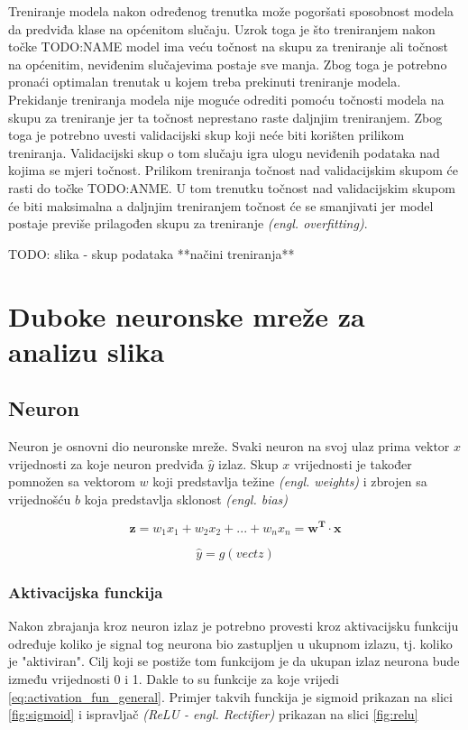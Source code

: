 \documentclass[times, utf8, zavrsni,numeric,pstricks]{fer}
\newcommand{\vect}[1]{\boldsymbol{#1}}
\begin{document}
Treniranje modela nakon određenog trenutka može pogoršati sposobnost modela da predviđa klase na općenitom slučaju. Uzrok toga je što treniranjem nakon točke TODO:NAME model ima veću točnost na skupu za treniranje ali točnost na općenitim, neviđenim slučajevima postaje sve manja. Zbog toga je potrebno pronaći optimalan trenutak u kojem treba prekinuti treniranje modela. Prekidanje treniranja modela nije moguće odrediti pomoću točnosti modela na skupu za treniranje jer ta točnost neprestano raste daljnjim treniranjem. Zbog toga je potrebno uvesti validacijski skup koji neće biti korišten prilikom treniranja. Validacijski skup o tom slučaju igra ulogu neviđenih podataka nad kojima se mjeri točnost. Prilikom treniranja točnost nad validacijskim skupom će rasti do točke TODO:ANME. U tom trenutku točnost nad validacijskim skupom će biti maksimalna a daljnjim treniranjem točnost će se smanjivati jer model postaje previše prilagođen skupu za treniranje \textit{(engl. overfitting)}. 

TODO: slika - skup podataka  
**načini treniranja**

\section{Duboke neuronske mreže za analizu slika}
\subsection{Neuron}
Neuron je osnovni dio neuronske mreže. Svaki neuron na svoj ulaz prima vektor $x$ vrijednosti za koje neuron predviđa $\hat{y}$ izlaz. Skup $x$ vrijednosti je također pomnožen sa vektorom $w$ koji predstavlja težine \textit{(engl. weights)} i zbrojen sa vrijednošću $b$ koja predstavlja sklonost \textit{(engl. bias)}


\begin{equation}\label{eq:neuron}
	\vect{z}=w_1x_1+w_2x_2+...+w_nx_n=\vect{w^{T}} \cdot \vect{x}
\end{equation}

\begin{equation}\label{eq:neuron}
	\hat{y} = g(vect{z})
\end{equation}

\subsubsection{Aktivacijska funckija}

Nakon zbrajanja kroz neuron izlaz je potrebno provesti kroz aktivacijsku funkciju određuje koliko je signal tog neurona bio zastupljen u ukupnom izlazu, tj. koliko je "aktiviran". Cilj koji se postiže tom funkcijom je da ukupan izlaz neurona bude između vrijednosti 0 i 1. Dakle to su funkcije za koje vrijedi \ref{eq:activation_fun_general}. Primjer takvih funckija je sigmoid prikazan na slici \ref{fig:sigmoid} i ispravljač \textit{(ReLU - engl. Rectifier)} prikazan na slici \ref{fig:relu}
\end{document}

